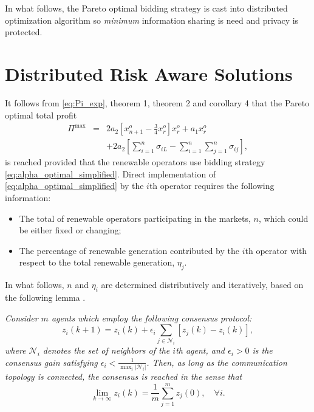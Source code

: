 \documentclass[conference]{IEEEtran}
\begin{document}
In what follows, the Pareto optimal bidding strategy is cast into distributed optimization algorithm so {\it minimum} information sharing is need and privacy is protected.   

\section{Distributed Risk Aware Solutions}

It follows from \eqref{eq:Pi_exp}, theorem 1, theorem 2 and corollary 4 that the Pareto optimal total profit 
\begin{eqnarray*}
    \Pi^{\max}  
     & = & 2a_2\left[  x_{n+1}^o - \frac{3}{4} x_r^o \right]x_r^o   +a_1 x_r^o  \nonumber \\ && 
     + 2a_2 \left[ \sum_{i=1}^n \sigma_{iL} -\sum_{i=1}^n\sum_{j=1}^n\sigma_{ij}\right],
\end{eqnarray*}
is reached provided that the renewable operators use bidding strategy \eqref{eq:alpha_optimal_simplified}.
Direct implementation of \eqref{eq:alpha_optimal_simplified} by the $i$th operator requires the following information:
\begin{itemize}
    \item The total of renewable operators participating in the markets, $n$, which could be either fixed or changing; 
    \item The percentage of renewable generation contributed by the $i$th operator with respect to the total renewable generation, $\eta_j$.
\end{itemize}
In what follows, $n$ and $\eta_i$ are determined distributively and iteratively, based on the following lemma \cite{qu}. 

 {\it Consider $m$ agents which employ the following consensus protocol:
\begin{equation*}
z_i(k+1) = z_i(k) + \epsilon_i \sum_{j \in \mathcal{N}_i} [z_j(k) - z_i(k)], \label{eq:consensus*}
\end{equation*}
where $\mathcal{N}_i$ denotes the set of neighbors of the $i$th agent, and $\epsilon_i > 0$ is the consensus gain satisfying $\epsilon_i < \tfrac{1}{\max_i |\mathcal{N}_i|}$. Then, as long as the communication topology is connected, the consensus is reached in the sense that  
\begin{equation*}
\lim_{k \to \infty} z_i(k) = \frac{1}{m}\sum_{j=1}^m z_j(0), \quad \forall i.
\end{equation*}
}
\end{document}
